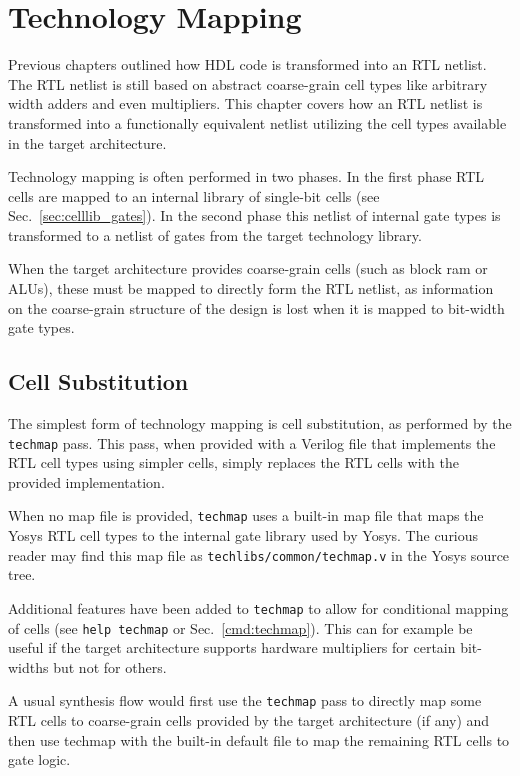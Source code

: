 
\chapter{Technology Mapping}
\label{chapter:techmap}

Previous chapters outlined how HDL code is transformed into an RTL netlist. The
RTL netlist is still based on abstract coarse-grain cell types like arbitrary
width adders and even multipliers. This chapter covers how an RTL netlist is
transformed into a functionally equivalent netlist utilizing the cell types
available in the target architecture.

Technology mapping is often performed in two phases. In the first phase RTL cells
are mapped to an internal library of single-bit cells (see Sec.~\ref{sec:celllib_gates}).
In the second phase this netlist of internal gate types is transformed to a netlist
of gates from the target technology library.

When the target architecture provides coarse-grain cells (such as block ram
or ALUs), these must be mapped to directly form the RTL netlist, as information
on the coarse-grain structure of the design is lost when it is mapped to
bit-width gate types.

\section{Cell Substitution}

The simplest form of technology mapping is cell substitution, as performed by
the {\tt techmap} pass. This pass, when provided with a Verilog file that
implements the RTL cell types using simpler cells, simply replaces the RTL
cells with the provided implementation.

When no map file is provided, {\tt techmap} uses a built-in map file that
maps the Yosys RTL cell types to the internal gate library used by Yosys.
The curious reader may find this map file as {\tt techlibs/common/techmap.v} in
the Yosys source tree.

Additional features have been added to {\tt techmap} to allow for conditional
mapping of cells (see {\tt help techmap} or Sec.~\ref{cmd:techmap}). This can
for example be useful if the target architecture supports hardware multipliers for
certain bit-widths but not for others.

A usual synthesis flow would first use the {\tt techmap} pass to directly map
some RTL cells to coarse-grain cells provided by the target architecture (if
any) and then use techmap with the built-in default file to map the remaining
RTL cells to gate logic.

